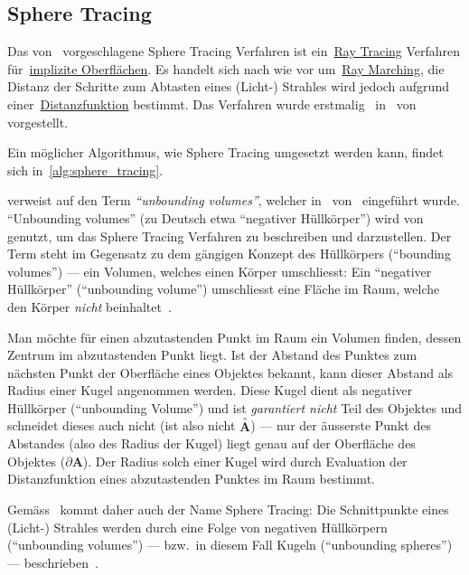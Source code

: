 \subsection{Sphere Tracing}
\label{subsec:sphere_tracing}

Das von~\citeauthor{hart_sphere_1994} vorgeschlagene Sphere Tracing
Verfahren ist ein~\hyperref[subsec:ray_tracing]{Ray Tracing} Verfahren
für~\hyperref[subsec:implicit_surfaces]{implizite Oberflächen}. Es
handelt sich nach wie vor um~\hyperref[subsec:ray_marching]{Ray
    Marching}, die Distanz der Schritte zum Abtasten eines (Licht-)
Strahles wird jedoch aufgrund
einer~\hyperref[ssubsec:distance_functions]{Distanzfunktion} bestimmt.
Das Verfahren wurde erstmalig~\citeyear{hart_ray_1989}
in~ von~\citeauthor{hart_ray_1989} vorgestellt.

Ein möglicher Algorithmus, wie Sphere Tracing umgesetzt werden kann,
findet sich in~\autoref{alg:sphere_tracing}.

\citeauthor{hart_sphere_1994} verweist auf den Term \textit{``unbounding
    volumes''}, welcher in~
von~\cite{hart_ray_1989} eingeführt wurde.  ``Unbounding volumes'' (zu
Deutsch etwa ``negativer Hüllkörper'') wird
von~\citeauthor{hart_ray_1989} genutzt, um das Sphere Tracing Verfahren
zu beschreiben und darzustellen. Der Term steht im Gegensatz zu dem
gängigen Konzept des Hüllkörpers (``bounding volumes'') --- ein Volumen,
welches einen Körper umschliesst: Ein ``negativer Hüllkörper''
(``unbounding volume'') umschliesst eine Fläche im Raum, welche den
Körper \textit{nicht} beinhaltet~\parencite[S. 291]{hart_ray_1989}.

Man möchte für einen abzutastenden Punkt im Raum ein Volumen finden,
dessen Zentrum im abzutastenden Punkt liegt. Ist der Abstand des Punktes
zum nächsten Punkt der Oberfläche eines Objektes bekannt, kann dieser
Abstand als Radius einer Kugel angenommen werden. Diese Kugel dient als
negativer Hüllkörper (``unbounding Volume'') und ist \textit{garantiert
    nicht} Teil des Objektes und schneidet dieses auch nicht (ist also
nicht $\overset{\circ}{\bm{A}}$) --- nur der äusserste Punkt des
Abstandes (also des Radius der Kugel) liegt genau auf der Oberfläche des
Objektes ($\partial \bm{A}$). Der Radius solch einer Kugel wird durch
Evaluation der Distanzfunktion eines abzutastenden Punktes im Raum
bestimmt.

Gemäss~\citeauthor{hart_sphere_1994} kommt daher auch der Name Sphere Tracing: Die
Schnittpunkte eines (Licht-) Strahles werden durch eine Folge von negativen
Hüllkörpern (``unbounding volumes'') --- bzw.\ in diesem Fall Kugeln
(``unbounding spheres'') --- beschrieben~\parencite[S. 530]{hart_sphere_1994}.

